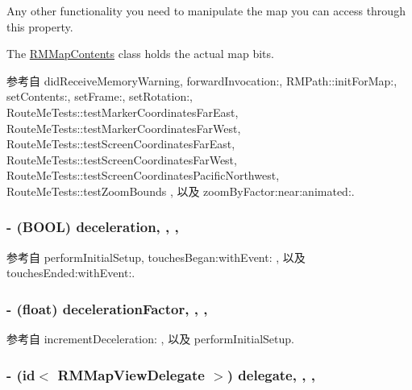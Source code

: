 Any other functionality you need to manipulate the map you can access through this property. 

The \hyperlink{interface_r_m_map_contents}{R\-M\-Map\-Contents} class holds the actual map bits. 

参考自 did\-Receive\-Memory\-Warning, forward\-Invocation\-:, R\-M\-Path\-::init\-For\-Map\-:, set\-Contents\-:, set\-Frame\-:, set\-Rotation\-:, Route\-Me\-Tests\-::test\-Marker\-Coordinates\-Far\-East, Route\-Me\-Tests\-::test\-Marker\-Coordinates\-Far\-West, Route\-Me\-Tests\-::test\-Screen\-Coordinates\-Far\-East, Route\-Me\-Tests\-::test\-Screen\-Coordinates\-Far\-West, Route\-Me\-Tests\-::test\-Screen\-Coordinates\-Pacific\-Northwest, Route\-Me\-Tests\-::test\-Zoom\-Bounds , 以及 zoom\-By\-Factor\-:near\-:animated\-:.

\hypertarget{interface_r_m_map_view_aba614ce906ab6f54581593002a4a6e78}{
\subsubsection[{deceleration}]{\setlength{\rightskip}{0pt plus 5cm}-\/ (B\-O\-O\-L) deceleration\hspace{0.3cm}{\ttfamily [read]}, {\ttfamily [write]}, {\ttfamily [atomic]}, {\ttfamily [assign]}}}\label{interface_r_m_map_view_aba614ce906ab6f54581593002a4a6e78}


参考自 perform\-Initial\-Setup, touches\-Began\-:with\-Event\-: , 以及 touches\-Ended\-:with\-Event\-:.

\hypertarget{interface_r_m_map_view_a1e9a66251764c79b4b6c43dc92d8d245}{
\subsubsection[{deceleration\-Factor}]{\setlength{\rightskip}{0pt plus 5cm}-\/ (float) deceleration\-Factor\hspace{0.3cm}{\ttfamily [read]}, {\ttfamily [write]}, {\ttfamily [atomic]}, {\ttfamily [assign]}}}\label{interface_r_m_map_view_a1e9a66251764c79b4b6c43dc92d8d245}


参考自 increment\-Deceleration\-: , 以及 perform\-Initial\-Setup.

\hypertarget{interface_r_m_map_view_a4703ad41a6e6ace59dc9e1bee3d3f382}{
\subsubsection[{delegate}]{\setlength{\rightskip}{0pt plus 5cm}-\/ (id$<$ {\bf R\-M\-Map\-View\-Delegate} $>$) delegate\hspace{0.3cm}{\ttfamily [read]}, {\ttfamily [write]}, {\ttfamily [atomic]}, {\ttfamily [assign]}}}\label{interface_r_m_map_view_a4703ad41a6e6ace59dc9e1bee3d3f382}


